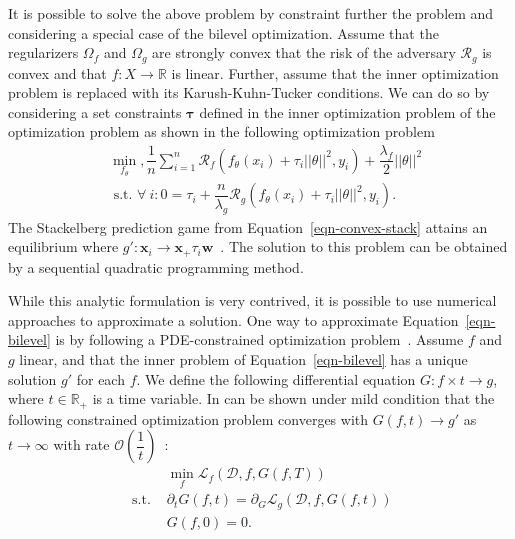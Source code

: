 It is possible to solve the above problem by constraint further the problem and considering a special case of the bilevel optimization. Assume that the regularizers $\Omega_f$ and $\Omega_g$ are strongly convex that the risk of the adversary $\mathcal{R}_g$ is convex and that $f:X\to\mathbb{R}$ is linear. Further, assume that the inner optimization problem is replaced with its Karush-Kuhn-Tucker conditions. We can do so by considering a set constraints $\bm\tau$ defined in the inner optimization problem of the optimization problem as shown in the following optimization problem
\begin{equation}
    \label{eqn-convex-stack}
    \begin{split}
    &\min_{f_\theta}, \dfrac{1}{n}\sum_{i=1}^n\mathcal{R}_f(f_\theta(x_i) + \tau_i||\theta||^2, y_i) + \dfrac{\lambda_f}{2}||\theta||^2\\
    &\text{ s.t. } \forall~i: 0=\tau_i + \dfrac{n}{\lambda_g}\mathcal{R}_g(f_\theta(x_i) + \tau_i||\theta||^2, y_i).
    \end{split}
\end{equation}
The Stackelberg prediction game from Equation~\eqref{eqn-convex-stack} attains an equilibrium where $g':\bm x_i\to \bm x_ + \tau_i\bm w$~\cite{bruckner_stackelberg}. The solution to this problem can be obtained by a sequential quadratic programming method. 

While this analytic formulation is very contrived, it is possible to use numerical approaches to approximate a solution. One way to approximate Equation~\eqref{eqn-bilevel} is by following a PDE-constrained optimization problem~\cite{naveiro_gradient_stackelberg}. Assume $f$ and $g$ linear, and that the inner problem of Equation~\eqref{eqn-bilevel} has a unique solution $g'$ for each $f$. We define the following differential equation $G:f\times t\to g$, where $t\in\mathbb{R}_+$ is a time variable. In can be shown under mild condition that the following constrained optimization problem converges with $G(f,t)\to g'$ as $t\to\infty$ with rate $\mathcal O(\dfrac{1}{t})$~\cite{naveiro_gradient_stackelberg}:
\begin{equation*}
    \begin{split}
        &\min_f \mathcal{L}_f(\mathcal{D}, f, G(f,T))\\
        \text{ s.t. } &\partial_tG(f, t) = \partial_G\mathcal{L}_g(\mathcal{D}, f, G(f, t))\\
        & G(f, 0) = 0.
    \end{split}
\end{equation*}


